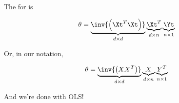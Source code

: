         \begin{kequation}
        
            The  for  is 
            
            \begin{equation*}
                \theta = 
                \underbrace{ 
                \inv{ \left(  \Xt^T\Xt  \right)  }
                }_{d \times d}
                \underbrace{
                \Xt^T
                }_{d \times n}
                \underbrace{
                \Yt
                }_{n \times 1} 
            \end{equation*}
            
            Or, in our  notation,
            
            \begin{equation*}
                \theta = 
                \underbrace{ 
                \inv{ \left(  XX^T  \right)  }
                }_{d \times d}
                \underbrace{
                X
                }_{d \times n}
                \underbrace{
                Y^T
                }_{n \times 1} 
            \end{equation*}
            
        \end{kequation}
        
    And we're done with OLS!

        
\pagebreak
